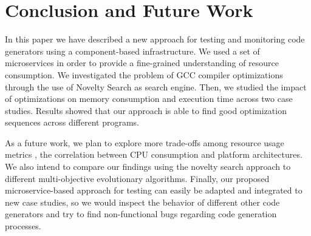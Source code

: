 \section{Conclusion and Future Work}

In this paper we have described a new approach for testing and monitoring code generators using a component-based infrastructure. 
We used a set of microservices in order to provide a fine-grained understanding of resource consumption. 
We investigated the problem of GCC compiler optimizations through the use of Novelty Search as search engine. 
Then, we studied the impact of optimizations on memory consumption and execution time across two case studies. 
Results showed that our approach is able to find good optimization sequences across different programs.

As a future work, we plan to explore more trade-offs among resource usage metrics \eg, the correlation between CPU consumption and platform architectures. 
We also intend to compare our findings using the novelty search approach to different multi-objective evolutionary algorithms. 
Finally, our proposed microservice-based approach for testing can easily be adapted and integrated to new case studies, so we would inspect the behavior of different other code generators and try to find non-functional bugs regarding code generation processes.

